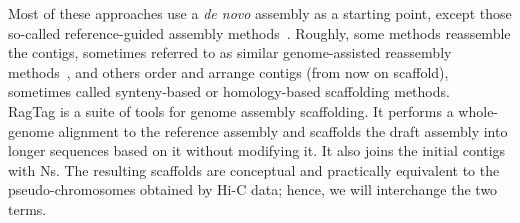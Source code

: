 Most of these approaches use a \textit{de novo} assembly as a starting point, except those so-called reference-guided assembly methods~\cite{ReferenceguidedAssemblyFour,lischerReferenceguidedNovoAssembly2017}. Roughly, some methods reassemble the contigs, sometimes referred to as similar genome-assisted reassembly methods~\cite{baoAlignGraphAlgorithmSecondary2014,huangAlignGraph2SimilarGenomeassisted2021,baoReMILOReferenceAssisted2018}, and others order and arrange contigs (from now on scaffold), sometimes called synteny-based or homology-based scaffolding methods.~\cite{kimReferenceassistedChromosomeAssembly2013,kolmogorovRagout2022,alongeAutomatedAssemblyScaffolding2022}\\

RagTag is a suite of tools for genome assembly scaffolding. It performs a whole-genome alignment to the reference assembly and scaffolds the draft assembly into longer sequences based on it without modifying it. It also joins the initial contigs with Ns. The resulting scaffolds are conceptual and practically equivalent to the pseudo-chromosomes obtained by \ac{Hi-C} data; hence, we will interchange the two terms. \\